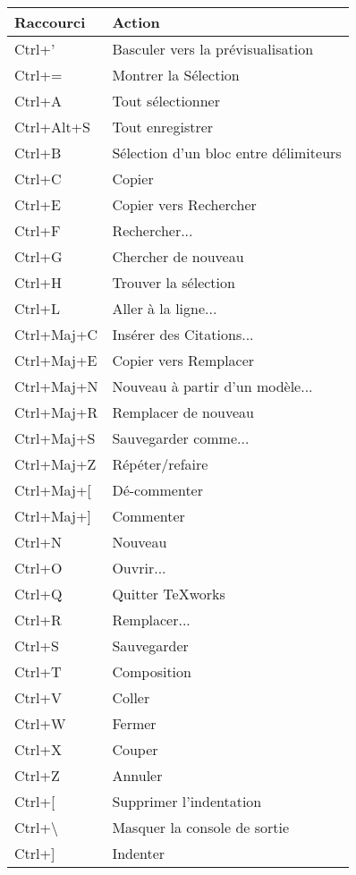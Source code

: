 \begin{longtable}{Pl}
\toprule
Raccourci           & Action \\
\midrule \endhead
Ctrl+'              & Basculer vers la prévisualisation \\
Ctrl+=              & Montrer la Sélection \\
Ctrl+A              & Tout sélectionner \\
Ctrl+Alt+S          & Tout enregistrer \\
Ctrl+B              & Sélection d'un bloc entre délimiteurs \\
Ctrl+C              & Copier \\
Ctrl+E              & Copier vers Rechercher \\
Ctrl+F              & Rechercher... \\
Ctrl+G              & Chercher de nouveau \\
Ctrl+H              & Trouver la sélection \\
Ctrl+L              & Aller à la ligne... \\
Ctrl+Maj+C          & Insérer des Citations... \\
Ctrl+Maj+E          & Copier vers Remplacer \\
Ctrl+Maj+N          & Nouveau à partir d'un modèle... \\
Ctrl+Maj+R          & Remplacer de nouveau \\
Ctrl+Maj+S          & Sauvegarder comme... \\
Ctrl+Maj+Z          & Répéter/refaire \\
Ctrl+Maj+[          & Dé{-}commenter \\
Ctrl+Maj+]          & Commenter \\
Ctrl+N              & Nouveau \\
Ctrl+O              & Ouvrir... \\
Ctrl+Q              & Quitter TeXworks \\
Ctrl+R              & Remplacer... \\
Ctrl+S              & Sauvegarder \\
Ctrl+T              & Composition \\
Ctrl+V              & Coller \\
Ctrl+W              & Fermer \\
Ctrl+X              & Couper \\
Ctrl+Z              & Annuler \\
Ctrl+[              & Supprimer l'indentation \\
Ctrl+\textbackslash & Masquer la console de sortie \\
Ctrl+]              & Indenter \\
\bottomrule
\end{longtable}
